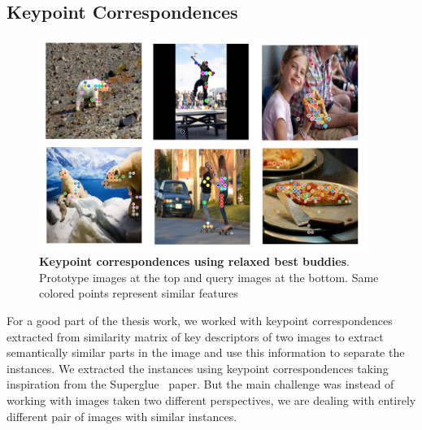 \subsection{Keypoint Correspondences}
\label{section:keypoint-correspondences}
\begin{figure}
	\centering
	\includegraphics[width=0.95\textwidth]{Images/main/correspondences.png}
	\caption[\textbf{Keypoint correspondences using relaxed best buddies}]{\textbf{Keypoint correspondences using relaxed best buddies}. Prototype images at the top and query images at the bottom. Same colored points represent similar features }
	\label{fig:correspondecences}
\end{figure}

For a good part of the thesis work, we worked with keypoint correspondences extracted from similarity matrix of key descriptors of two images to extract semantically similar parts in the image and use this information to separate the instances. We extracted the instances using keypoint correspondences taking inspiration from the Superglue~\cite{sarlin2020supergluelearningfeaturematching} paper. But the main challenge was instead of working with images taken two different perspectives, we are dealing with entirely different pair of images with similar instances.


